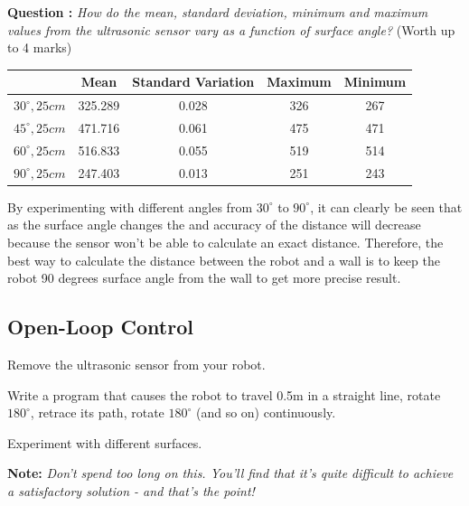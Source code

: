 \documentclass[hidelinks,a4paper,11pt]{article}
\newcounter{question}
\newcommand\myq{\refstepcounter{question}\thequestion}
\begin{document}
	{\bfseries Question \myq:}  \emph{How do the mean, standard deviation, minimum and maximum values from the ultrasonic sensor vary as a function of surface angle?} (Worth up to 4 marks)\\
	\begin{mdframed}
		\begin{center}
			\begin{tabular}{ | c | c | c | c | c |} \hline
				& \bf{Mean} & \bf{Standard Variation} & \bf{Maximum} & \bf{Minimum} \\ \hline
				\bf{$30^{\circ}, 25cm$} & 325.289 & 0.028 & 326 & 267 \\ \hline
				\bf{$45^{\circ}, 25cm$} & 471.716 & 0.061 & 475 & 471 \\ \hline
				\bf{$60^{\circ}, 25cm$} & 516.833 & 0.055 & 519 & 514 \\ \hline
				\bf{$90^{\circ}, 25cm$} & 247.403 & 0.013 & 251 & 243 \\ \hline
			\end{tabular}
		\end{center}
		By experimenting with different angles from $30^{\circ}$ to $90^{\circ}$, it can clearly be seen that as the surface angle changes the and accuracy of the distance will decrease because the sensor won't be able to calculate an exact distance. Therefore, the best way to calculate the distance between the robot and a wall is to keep the robot 90 degrees surface angle from the wall to get more precise result.
	\end{mdframed}
	\vspace*{\baselineskip}
	
	
	\subsection{Open-Loop Control}
	
	\begin{todolist}
		\item Remove the ultrasonic sensor from your robot.
		\item Write a program that causes the robot to travel 0.5m in a straight line, rotate $180^{\circ}$, retrace its path, rotate $180^{\circ}$ (and so on) continuously.
		\item Experiment with different surfaces.
	\end{todolist}
	
	{\bfseries Note:}  \emph{Don't spend too long on this.  You'll find that it's quite difficult to achieve a satisfactory solution - and that's the point!}
	
\end{document}
